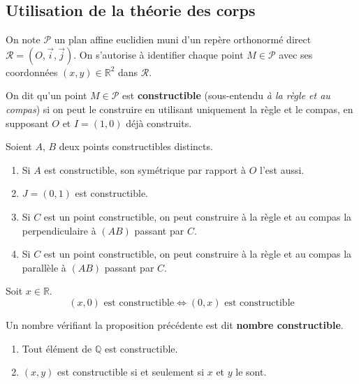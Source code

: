   \subsection{Utilisation de la théorie des corps}


  On note $\mathcal{P}$ un plan affine euclidien muni d'un repère orthonormé direct $\mathcal{R} = (O, \overrightarrow{i}, \overrightarrow{j})$. On s'autorise à identifier chaque point $M \in \mathcal{P}$ avec ses coordonnées $(x,y) \in \mathbb{R}^2$ dans $\mathcal{R}$.

  \begin{definition}
    On dit qu'un point $M \in \mathcal{P}$ est \textbf{constructible} (sous-entendu \textit{à la règle et au compas}) si on peut le construire en utilisant uniquement la règle et le compas, en supposant $O$ et $I=(1,0)$ déjà construits.
  \end{definition}

  \begin{proposition}
    Soient $A$, $B$ deux points constructibles distincts.
    \begin{enumerate}[label=(\roman*)]
      \item Si $A$ est constructible, son symétrique par rapport à $O$ l'est aussi.
      \item $J = (0,1)$ est constructible.
      \item Si $C$ est un point constructible, on peut construire à la règle et au compas la perpendiculaire à $(AB)$ passant par $C$.
      \item Si $C$ est un point constructible, on peut construire à la règle et au compas la parallèle à $(AB)$ passant par $C$.
    \end{enumerate}
  \end{proposition}

  \begin{proposition}
    Soit $x \in \mathbb{R}$.
    \[ (x,0) \text{ est constructible} \iff (0,x) \text{ est constructible} \]
  \end{proposition}

  \begin{definition}
    Un nombre vérifiant la proposition précédente est dit \textbf{nombre constructible}.
  \end{definition}

  \begin{proposition}
    \begin{enumerate}[label=(\roman*)]
      \item Tout élément de $\mathbb{Q}$ est constructible.
      \item $(x,y)$ est constructible si et seulement si $x$ et $y$ le sont.
    \end{enumerate}
  \end{proposition}

